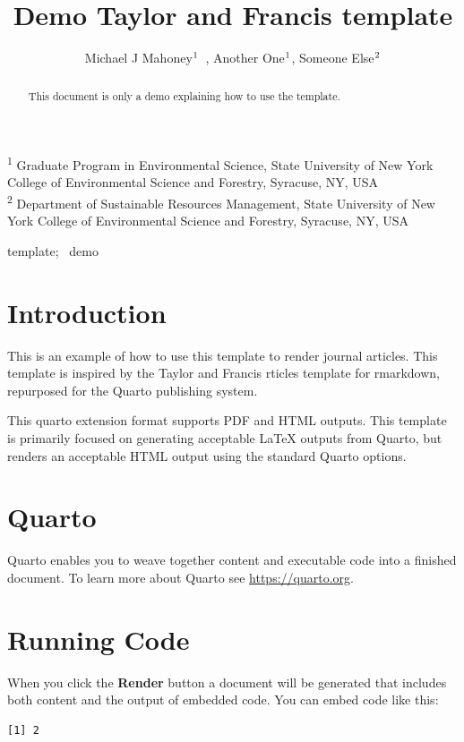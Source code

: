 \documentclass[
]{interact}
\title{Demo Taylor and Francis template}
\author{Michael J
Mahoney$\textsuperscript{1}$~\orcidlink{0000-0003-2402-304X}, Another
One$\textsuperscript{1}$, Someone Else$\textsuperscript{2}$}
\begin{document}
\captionsetup{labelsep=space}
\maketitle
\textsuperscript{1} Graduate Program in Environmental Science, State
University of New York College of Environmental Science and
Forestry, Syracuse, NY, USA\\ \textsuperscript{2} Department of
Sustainable Resources Management, State University of New York College
of Environmental Science and Forestry, Syracuse, NY, USA
\begin{abstract}
This document is only a demo explaining how to use the template.
\end{abstract}
\begin{keywords}
\def\sep{;\ }
template\sep 
demo
\end{keywords}


\section{Introduction}\label{sec-intro}

This is an example of how to use this template to render journal
articles. This template is inspired by the Taylor and Francis rticles
template for rmarkdown, repurposed for the Quarto publishing system.

This quarto extension format supports PDF and HTML outputs. This
template is primarily focused on generating acceptable {\LaTeX} outputs
from Quarto, but renders an acceptable HTML output using the standard
Quarto options.

\section{Quarto}\label{quarto}

Quarto enables you to weave together content and executable code into a
finished document. To learn more about Quarto see
\url{https://quarto.org}.

\section{Running Code}\label{running-code}

When you click the \textbf{Render} button a document will be generated
that includes both content and the output of embedded code. You can
embed code like this:

\begin{verbatim}
[1] 2
\end{verbatim}
\end{document}
